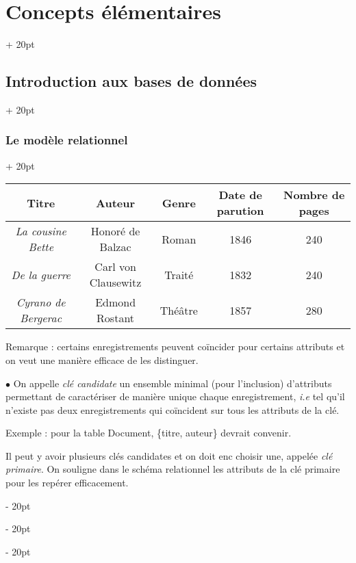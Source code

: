 \documentclass[a4paper, 12pt, twoside]{article}
\newcommand{\ind}[1][20pt]{\advance\leftskip + #1}
\newcommand{\deind}[1][20pt]{\advance\leftskip - #1}
\newenvironment{indt}[2][20pt]{#2 \par \ind[#1]}{\par \deind} %
\begin{document}
\begin{indt}{\section{Concepts élémentaires}}
\begin{indt}{\subsection{Introduction aux bases de données}}
\begin{indt}{\subsubsection{Le modèle relationnel}}
                \begin{tabular}{|c|c|c|c|c|}
                    \hline
                    Titre
                    & Auteur
                    & Genre
                    & Date de parution
                    & Nombre de pages
                    \\
                    \hline
                    \textit{La cousine Bette}
                    & Honoré de Balzac
                    & Roman
                    & 1846
                    & 240
                    \\
                    \textit{De la guerre}
                    & Carl von Clausewitz
                    & Traité
                    & 1832
                    & 240
                    \\
                    \textit{Cyrano de Bergerac}
                    & Edmond Rostant
                    & Théâtre
                    & 1857
                    & 280
                    \\
                    \hline
                \end{tabular}
                
                \vspace{12pt}
                
                Remarque : certains enregistrements peuvent coïncider pour certains attributs et on veut une manière efficace de les distinguer.
                
                \vspace{12pt}
                
                $\bullet$ On appelle \textit{clé candidate} un ensemble minimal (pour l'inclusion) d'attributs permettant de caractériser de manière unique chaque enregistrement, \textit{i.e} tel qu'il n'existe pas deux enregistrements qui coïncident sur tous les attributs de la clé.
                
                \vspace{6pt}
                
                Exemple : pour la table Document, \{titre, auteur\} devrait convenir.
                
                \vspace{6pt}
                
                Il peut y avoir plusieurs clés candidates et on doit enc choisir une, appelée \textit{clé primaire}. On souligne dans le schéma relationnel les attributs de la clé primaire pour les repérer efficacement.
                

\end{indt}
\end{indt}
\end{indt}
\end{document}
